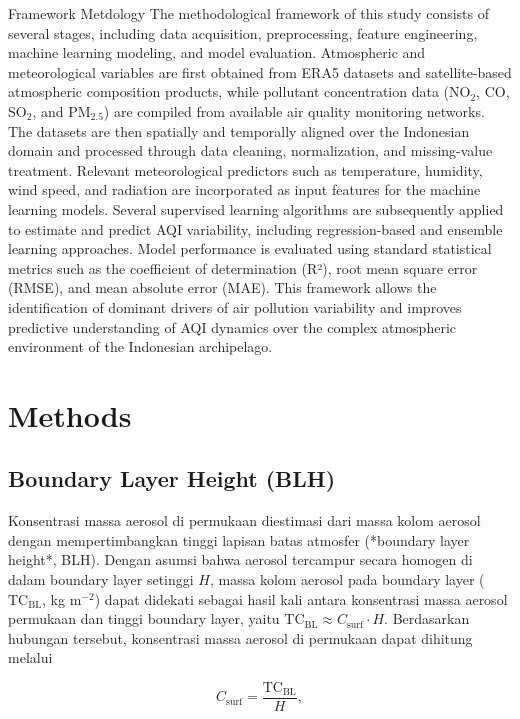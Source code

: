 \documentclass[pdflatex,sn-mathphys-num]{sn-jnl}%
\theoremstyle{thmstyleone}%
\theoremstyle{thmstyletwo}%
\theoremstyle{thmstylethree}%
\begin{document}
Framework Metdology
The methodological framework of this study consists of several stages, including data acquisition, preprocessing, feature engineering, machine learning modeling, and model evaluation. Atmospheric and meteorological variables are first obtained from ERA5 datasets and satellite-based atmospheric composition products, while pollutant concentration data (NO$_2$, CO, SO$_2$, and PM$_{2.5}$) are compiled from available air quality monitoring networks. The datasets are then spatially and temporally aligned over the Indonesian domain and processed through data cleaning, normalization, and missing-value treatment. Relevant meteorological predictors such as temperature, humidity, wind speed, and radiation are incorporated as input features for the machine learning models. Several supervised learning algorithms are subsequently applied to estimate and predict AQI variability, including regression-based and ensemble learning approaches. Model performance is evaluated using standard statistical metrics such as the coefficient of determination (R²), root mean square error (RMSE), and mean absolute error (MAE). This framework allows the identification of dominant drivers of air pollution variability and improves predictive understanding of AQI dynamics over the complex atmospheric environment of the Indonesian archipelago.

\section{Methods}\label{sec3}

\subsection{Boundary Layer Height (BLH)}
Konsentrasi massa aerosol di permukaan diestimasi dari massa kolom aerosol dengan mempertimbangkan tinggi lapisan batas atmosfer (*boundary layer height*, BLH). Dengan asumsi bahwa aerosol tercampur secara homogen di dalam boundary layer setinggi $H$, massa kolom aerosol pada boundary layer ($\mathrm{TC}_{\mathrm{BL}}$, kg m$^{-2}$) dapat didekati sebagai hasil kali antara konsentrasi massa aerosol permukaan dan tinggi boundary layer, yaitu $\mathrm{TC}_{\mathrm{BL}} \approx C_{\mathrm{surf}} \cdot H$. Berdasarkan hubungan tersebut, konsentrasi massa aerosol di permukaan dapat dihitung melalui

\begin{equation}
C_{\mathrm{surf}} = \frac{\mathrm{TC}_{\mathrm{BL}}}{H},
\end{equation}
\end{document}
